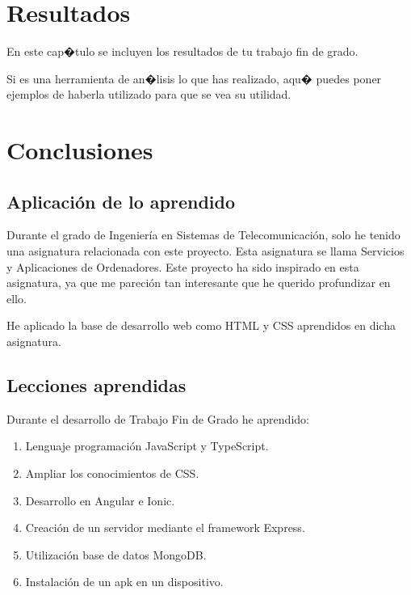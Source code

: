 \documentclass[a4paper, 12pt]{book}
\begin{document}

\cleardoublepage
\chapter{Resultados}

En este cap�tulo se incluyen los resultados de tu trabajo fin de grado.

Si es una herramienta de an�lisis lo que has realizado, aqu� puedes poner ejemplos de haberla utilizado para que se vea su utilidad.



\cleardoublepage
\chapter{Conclusiones}
\label{chap:conclusiones}




\section{Aplicaci\'on de lo aprendido}
\label{sec:aplicacion}

Durante el grado de Ingenier\'ia en Sistemas de Telecomunicaci\'on, solo he tenido una asignatura relacionada con este proyecto. Esta asignatura se llama Servicios y Aplicaciones de Ordenadores. Este proyecto ha sido inspirado en esta asignatura, ya que me pareci\'on tan interesante que he querido profundizar en ello. 

He aplicado la base de desarrollo web como HTML y CSS aprendidos en dicha asignatura.



\section{Lecciones aprendidas}
\label{sec:lecciones_aprendidas}

Durante el desarrollo de Trabajo Fin de Grado he aprendido:

\begin{enumerate}
  \item Lenguaje programaci\'on JavaScript y TypeScript.
  \item Ampliar los conocimientos de CSS.
  \item Desarrollo en Angular e Ionic.
  \item Creaci\'on de un servidor mediante el framework Express.
  \item Utilizaci\'on base de datos MongoDB.
  \item Instalaci\'on de un apk en un dispositivo.
\end{enumerate}
\end{document}
